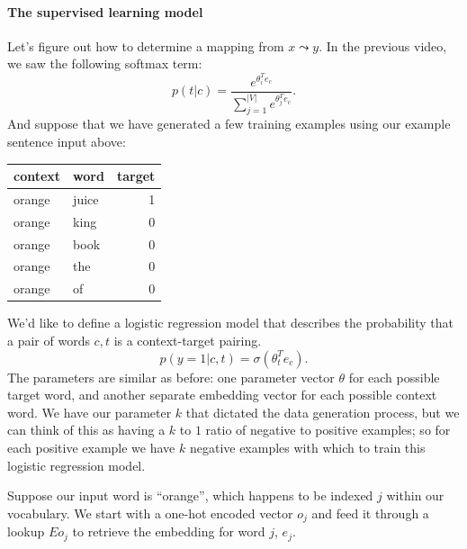 \documentclass[12pt]{article}
\begin{document}
\paragraph{The supervised learning model} Let's figure out how to determine a mapping from $x \leadsto y$. In the previous video, we saw the following softmax term:
\[
  p(t|c) = \frac{e^{\theta_i^T e_c}}{\sum_{j=1}^{|V|} e^{\theta_j^T e_c}}.
\]
And suppose that we have generated a few training examples using our example sentence input above:

\begin{table}[h]
  \centering
  \begin{tabular}{l l r}
    context & word & target \\
    \hline
    orange & juice & 1 \\
    orange & king &  0 \\
    orange & book &  0 \\
    orange & the  &  0 \\
    orange & of   &  0
  \end{tabular}
\end{table}

We'd like to define a logistic regression model that describes the probability that a pair of words $c, t$ is a context-target pairing.
\[
  p(y=1 | c, t) = \sigma(\theta_t^T e_c).
\]
The parameters are similar as before: one parameter vector $\theta$ for each possible target word, and another separate embedding vector for each possible context word. We have our parameter $k$ that dictated the data generation process, but we can think of this as having a $k$ to $1$ ratio of negative to positive examples; so for each positive example we have $k$ negative examples with which to train this logistic regression model.

Suppose our input word is ``orange'', which happens to be indexed $j$ within our vocabulary. We start with a one-hot encoded vector $o_j$ and feed it through a lookup $E o_j$ to retrieve the embedding for word $j$, $e_j$.

\begin{figure}[h]
  \centering
\end{figure}
\end{document}
